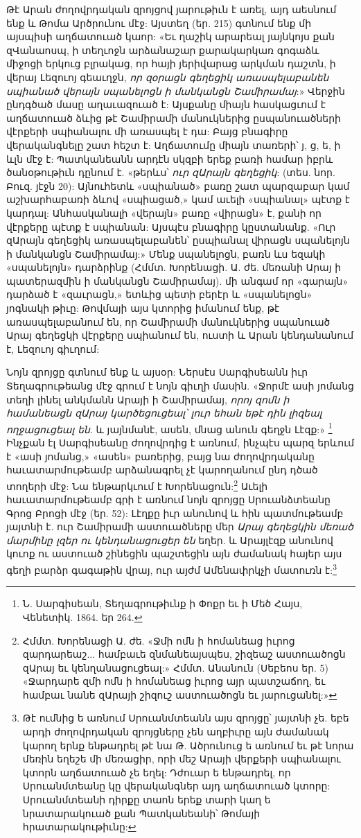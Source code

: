 \documentclass{article}
\begin{document}
{Թէ Արան ժողովրդական զրոյցով յարութիւն է առել, այդ աեսնում ենք և Թոմա Արծրունու մէջ: Այստեղ (եր. 215) գտնում ենք մի այսպիսի աղճատուած կաոր: «Եւ ղաշիկ արարեալ յայնկոյս քան զՎանաոսպ, ի տեղւոջն արձանաշար քարակարկառ գոգաձև միջոցի երկուց բլրակաց, որ հայի յերիվարաց արկման դաշտն, ի վերայ Լեզուոյ գեաւղջն, \emph{որ զօրացն գեղեցիկ առասպելաբանեն սպիանած վերայն սպանելոցն ի մանկանցն Շամիրամայ}:» Վերջին ընդգծած մասը աղաւազուած է: Այսքանը միայն հասկացւում է աղճատուած ձևից թէ Շամիրամի մանուկներից ըսպանուածների վէրքերի սպիանալու մի առասպել է դա: Բայց բնագիրը վերականգնելը շատ հեշտ է: Աղճատումը միայն տառերի՝ յ, ց, ե, ի ևլն մէջ է: Պատկանեանն արդէն սկզբի երեք բառի համար իբրև ծանօթութիւն դընում է. «թերևս՝ \emph{ուր զԱրայն գեղեցիկ}: (տես. նոր. Բուզ. յէջն 20): Այնուհետև «սպիանած» բառը շատ պարզաբար կամ աշխարհաբառի ձևով «սպիացած,» կամ աւելի «սպիանալ» պէտք է կարդալ: Անհասկանալի «վերայն» բառը «վիրացն» է, քանի որ վէրքերը պէտք է սպիանան: Այսպէս բնագիրը կըստանանք. «Ուր զԱրայն գեղեցիկ առասպելաբանեն՝ ըսպիանալ վիրացն սպանելոյն ի մանկանցն Շամիրամայ:» Մենք սպանելոցն, բառն ևս եզակի «սպանելոյն» դարձրինք (Հմմտ. Խորենացի. Ա. ժե. մեռանի Արայ ի պատերազմին ի մանկանցն Շամիրամայ). մի անգամ որ «գարայն» դարձած է «զաւրացն,» ետևից պետի բերէր և «սպանելոցն» յոգնակի թիւը: Թովմայի այս կտորից իմանում ենք, թէ առասպելաբանում են, որ Շամիրամի մանուկներից սպանուած Արայ գեղեցկի վէրքերը սպիանում են, ուստի և Արան կենդանանում է, Լեզուոյ գիւղում:

Նոյն զրոյցը գտնում ենք և այսօր: Ներսէս Սարգիսեանն իւր Տեղագրութեանց մէջ գրում է նոյն գիւղի մասին. «Ջորմէ ասի յոմանց տեղի լինել անկմանն Արայի ի Շամիրամայ, \emph{որոյ զոմն ի համանեացն զԱրայ կարծեցուցեալ՝ լուր եհան եթէ դին լիզեալ ողջացուցեալ են}. և յայնմանէ, ասեն, մնաց անուն գեղջն Լէզք:» \footnote{Ն. Սարգիսեան, Տեղագրութիւնք ի Փոքր եւ ի Մեծ Հայս, Վենետիկ. 1864. եր 264.} Ինչքան էլ Սարգիսեանը ժողովրդից է առնում, ինչպէս պարզ երևում է «ասի յոմանց,» «ասեն» բառերից, բայց նա ժողովրդականը հաւատարմութեամբ արձանագրել չէ կարողանում ընդ դծած տողերի մէջ: Նա ենթարկւում է Խորենացուն:\footnote{Հմմտ. Խորենացի Ա. ժե. «Ջմի ոմն ի հոմանեաց իւրոց զարդարեաշ... համբաւե զնմանեայսպես, շիզեաշ աստուածոցն զԱրայ եւ կենղանացուցեալ:» Հմմտ. Անանուն (Սեբեոս եր. 5) «Ջարդարե զմի ոմն ի հոմանեաց իւրոց այր պատշաճող, եւ համբաւ նանե զԱրայի շիզուշ աստուածոցն եւ յարուցանել:»} Աւելի հաւատարմութեամբ գրի է առնում նոյն զրոյցը Սրուանձտեանը Գրոց Բրոցի մէջ (եր. 52): Լէղքը իւր անունով և հին պատմութեամբ յայտնի է. ուր Շամիրամի աստուածները մեր \emph{Արայ գեղեցկին մեռած մարմինը լզեր ու կենդանացուցեր են} եղեր. և Արայլէզք անունով կուոք ու աստուած շինեցին պաշտեցին այն ժամանակ հայեր այս գեղի բարձր գագաթին վրայ, ուր այժմ Ամենափրկչի մատուռն է:\footnote{Թէ ումնից ե առնում Սրուանմտեանն այս զրոյցը՝ յայտնի չե. եբե արդի ժողովրդական զրոյցները չեն աղբիւրը այն ժամանակ կարող երնք ենթադրել թէ նա Թ. Ածրունուց ե առնում եւ թէ նորա մեռին եղեշե մի մեռացիր, որի մեշ Արայի վերքերի սպիանալու կտորն աղճատուած չե եղել: Դժուար ե ենթադրել, որ Սրուանմտեանը կը վերականգներ այդ աղճատուած կտորը: Սրուանմտեանի դիրքը տաոն երեք տարի կաղ ե նրատարակուած քան Պատկանեանի՝ Թոմայի հրատարակութիւնը:}

}
\end{document}

